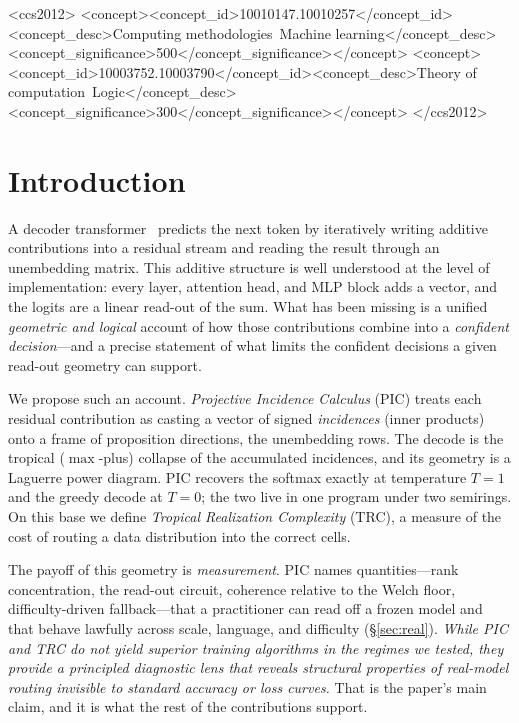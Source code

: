 \documentclass[sigconf,nonacm]{acmart}
\theoremstyle{definition}
\begin{document}
\begin{CCSXML}
<ccs2012>
<concept><concept_id>10010147.10010257</concept_id><concept_desc>Computing methodologies~Machine learning</concept_desc><concept_significance>500</concept_significance></concept>
<concept><concept_id>10003752.10003790</concept_id><concept_desc>Theory of computation~Logic</concept_desc><concept_significance>300</concept_significance></concept>
</ccs2012>
\end{CCSXML}


\maketitle

\section{Introduction}

A decoder transformer~\cite{vaswani2017attention} predicts the next token by
iteratively writing additive contributions into a residual stream and reading the
result through an unembedding matrix. This additive structure is well understood at
the level of implementation: every layer, attention head, and MLP block adds a
vector, and the logits are a linear read-out of the sum. What has been missing is a
unified \emph{geometric and logical} account of how those contributions combine
into a \emph{confident decision}---and a precise statement of what limits the
confident decisions a given read-out geometry can support.

We propose such an account. \emph{Projective Incidence Calculus} (PIC) treats each
residual contribution as casting a vector of signed \emph{incidences} (inner
products) onto a frame of proposition directions, the unembedding rows. The decode
is the tropical ($\max$-plus) collapse of the accumulated incidences, and its
geometry is a Laguerre power diagram. PIC recovers the softmax exactly at
temperature $T{=}1$ and the greedy decode at $T{=}0$; the two live in one program
under two semirings. On this base we define \emph{Tropical Realization Complexity}
(TRC), a measure of the cost of routing a data distribution into the correct cells.

The payoff of this geometry is \emph{measurement}. PIC names quantities---rank
concentration, the read-out circuit, coherence relative to the Welch floor,
difficulty-driven fallback---that a practitioner can read off a frozen model and
that behave lawfully across scale, language, and difficulty (\S\ref{sec:real}).
\emph{While PIC and TRC do not yield superior training algorithms in the regimes we
tested, they provide a principled diagnostic lens that reveals structural properties
of real-model routing invisible to standard accuracy or loss curves.} That is the
paper's main claim, and it is what the rest of the contributions support.
\end{document}
